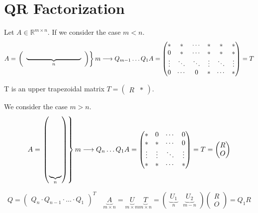 \chapter{QR Factorization}
Let $A \in \mathbb{R}^{m \times n}$. If we consider the case $m < n$.
\[
A = \left.
\left( \begin{array}{c}
\underbrace{\rule{3cm}{0pt}}_{n} \\
\end{array} \right)
\right\}m
\longrightarrow Q_{m-1}\ldots Q_1A = \begin{pmatrix}
    * & * & \cdots & *  & * & * \\
    0 & * & \cdots & *  & * & * \\
    \vdots & \ddots & \ddots & \vdots & \ddots & \vdots \\
    0 & \cdots & 0 & * & \cdots & * 
\end{pmatrix} = T
\]

T is an upper trapezoidal matrix $ T = \begin{pmatrix} R & * \end{pmatrix}$.

We consider the case $m > n$.
\[
A = \left.
\begin{pmatrix}
    \underbrace{\rule{0pt}{3cm}}_{n} \\
\end{pmatrix}
\right\}m
\longrightarrow Q_{n}\ldots Q_1A = \begin{pmatrix}
    * & 0 & \cdots & 0 \\
    * & * & \cdots & 0 \\
    \vdots & \vdots & \ddots & \vdots \\
    * & * & \cdots & *
\end{pmatrix} = T = \begin{pmatrix}
    R \\ O
\end{pmatrix}
\]

$$
Q = \begin{pmatrix} Q_n \cdot Q_{n-1} \cdot \ldots \cdot Q_1 \end{pmatrix}^T \quad
\underbrace{A}_{m \times n} = \underbrace{U}_{m \times m} \underbrace{T}_{m \times n}
= \begin{pmatrix}
    \underbrace{U_1}_{n} & \underbrace{U_2}_{m-n}
\end{pmatrix}
\begin{pmatrix}
    R \\ O
\end{pmatrix}
= Q_1R
$$

